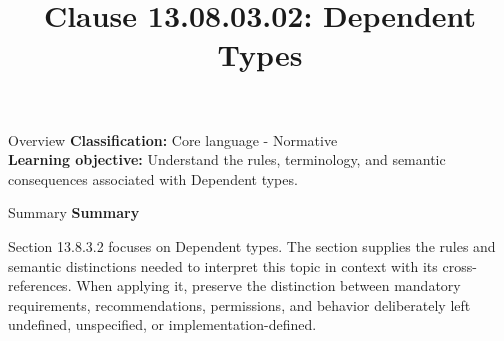 \documentclass[10pt,letterpaper]{article}
\title{Clause 13.08.03.02: Dependent Types}
\author{}
\date{}
\begin{document}
\maketitle
\begin{CornellOverviewBox}{Overview}
\textbf{Classification:} Core language - Normative\\[2pt]
\textbf{Learning objective:} Understand the rules, terminology, and semantic consequences associated with Dependent types.
\end{CornellOverviewBox}\begin{CornellSummaryBox}{Summary}
{\sffamily\bfseries\color{Accent} Summary}\par\vspace{3pt}Section 13.8.3.2 focuses on Dependent types. The section supplies the rules and semantic distinctions needed to interpret this topic in context with its cross-references. When applying it, preserve the distinction between mandatory requirements, recommendations, permissions, and behavior deliberately left undefined, unspecified, or implementation-defined.
\end{CornellSummaryBox}
\end{document}
